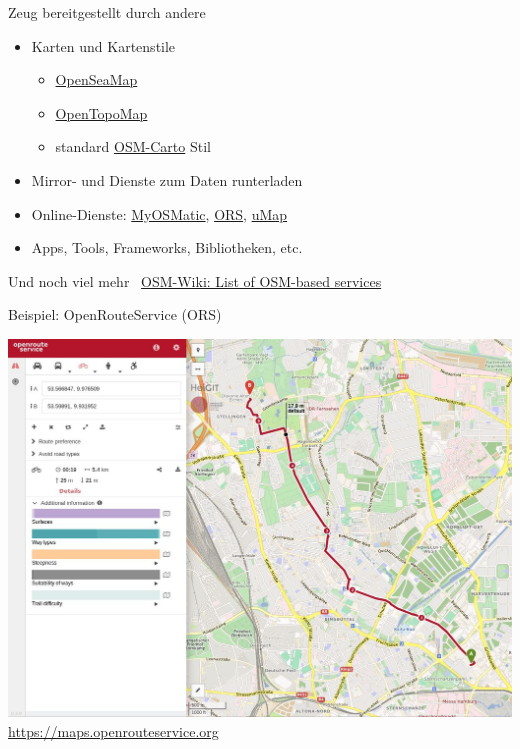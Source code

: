 \documentclass{beamer}
\begin{document}
			\begin{frame}{Zeug bereitgestellt durch andere}
				\begin{itemize}
					\item Karten und Kartenstile
					\begin{itemize}
						\item \href{https://map.openseamap.org/?zoom=13.5\&lon=9.96566\&lat=53.52952}{OpenSeaMap}
						\item \href{https://opentopomap.org}{OpenTopoMap}
						\item standard \href{https://github.com/gravitystorm/openstreetmap-carto}{OSM-Carto} Stil
					\end{itemize}
					\pause
					\item Mirror- und Dienste zum Daten runterladen
					\pause
					\item Online-Dienste: \href{https://print.get-map.org/}{MyOSMatic}, \href{https://maps.openrouteservice.org}{ORS}, \href{https://umap.openstreetmap.de}{uMap}
					\pause
					\item Apps, Tools, Frameworks, Bibliotheken, etc.
				\end{itemize}
				\pause
				\vspace{0.5cm}
				Und noch viel mehr \textrightarrow\ \href{https://wiki.openstreetmap.org/wiki/List\_of\_OSM-based\_services}{OSM-Wiki: List of OSM-based services}
			\end{frame}
			
			\begin{frame}{Beispiel: OpenRouteService (ORS)}
				\begin{center}
					\includegraphics[height=0.7\textheight]{images/openrouteservice.jpg}\\
					\url{https://maps.openrouteservice.org}
				\end{center}
			\end{frame}
			
\end{document}
